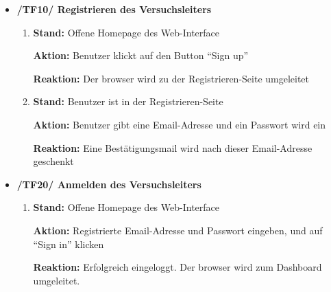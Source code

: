 \documentclass[a4paper]{scrreprt}
\begin{document}
            \begin{itemize}
                \item \textbf{/TF10/ Registrieren des Versuchsleiters}
                    \begin{enumerate}
                        \item \par \textbf{Stand: }Offene Homepage des Web-Interface
                            \par \textbf{Aktion: }Benutzer klickt auf den Button ``Sign up''
                            \par \textbf{Reaktion: }Der browser wird zu der Registrieren-Seite umgeleitet
                        \item \par \textbf{Stand: }Benutzer ist in der Registrieren-Seite
                             \par \textbf{Aktion: }Benutzer gibt eine Email-Adresse und ein Passwort wird ein
                             \par \textbf{Reaktion: }Eine Bestätigungsmail wird nach dieser Email-Adresse geschenkt
                   \end{enumerate}
                            
                    \item \textbf{/TF20/ Anmelden des Versuchsleiters}
                        \begin{enumerate}
                            \item \par \textbf{Stand: }Offene Homepage des Web-Interface
                                \par \textbf{Aktion: }Registrierte Email-Adresse und Passwort eingeben, und auf “Sign in” klicken
                                \par \textbf{Reaktion: }Erfolgreich eingeloggt. Der browser wird zum Dashboard umgeleitet.
                        \end{enumerate}


\end{itemize}
\end{document}
